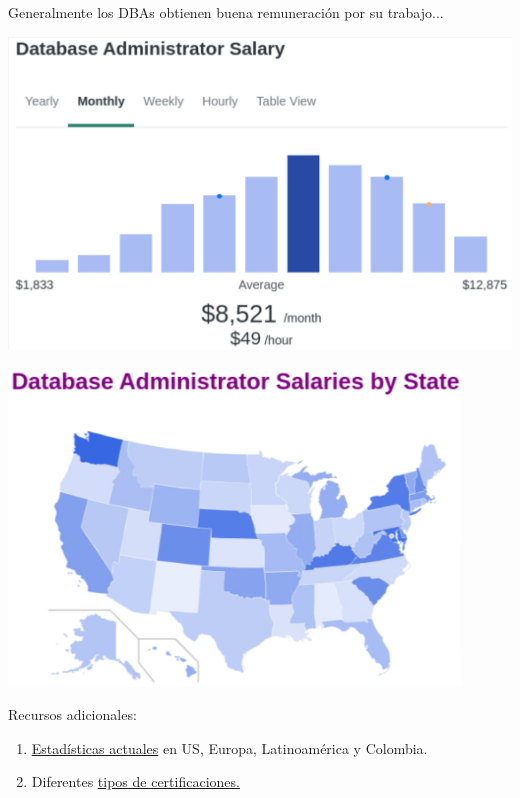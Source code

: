 \documentclass{beamer}
\begin{document}
\begin{frame}{Generalmente los DBAs obtienen buena remuneración por su trabajo...}
    \noindent 
    \begin{minipage}{0.45\textwidth}
        \includegraphics[width=\textwidth]{figures/dba_salary_plot}
    \end{minipage}
    \hspace{0.05\textwidth}
    \begin{minipage}{0.45\textwidth}
        \includegraphics[width=0.9\textwidth]{figures/dba_salary_map}
    \end{minipage}%
    \vspace{5mm}
    Recursos adicionales:
    \begin{enumerate}
        \item \href{https://www.cs.ucr.edu/~acald013/public/Javeriana/DBA_Salary.html}{Estadísticas actuales} en US, Europa, Latinoamérica y Colombia.
        \item Diferentes \href{https://www.cs.ucr.edu/~acald013/public/Javeriana/Certifications.html}{tipos de certificaciones.}
    \end{enumerate}

\end{frame}
\end{document}
